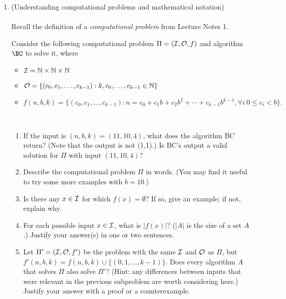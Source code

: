 \documentclass[11pt]{article}
\begin{document}
\begin{enumerate}
\begin{enumerate}
    \end{enumerate}
    
    \newpage
    
    \item (Understanding computational problems and mathematical notation)\\\\
    Recall the definition of a {\em computational problem} from Lecture Notes 1.  

 
    Consider the following computational problem $\Pi=(\mathcal{I},\mathcal{O},f)$ and algorithm $\BC$ to solve it, where
    \begin{itemize}                                
    \item $\mathcal{I} = \mathbb{N}\times\mathbb{N}\times \mathbb{N}$ 
    \item $\mathcal{O} = \{(c_0,c_1,\ldots,c_{k-1}) : k,c_0,\ldots,c_{k-1}\in \mathbb{N}\}$
    \item $f(n,b,k) = \{ (c_0,c_1,\ldots,c_{k-1}) : n=c_0+c_1b+c_2b^2+\cdots+c_{k-1}b^{k-1}, \forall i\ 0\leq c_i< b\}.$ 
    \end{itemize}

    
\begin{algorithm}[H]
    \\
    {
    \lElse{\Return{$\bot$}}}
\end{algorithm}


\begin{enumerate}
\item If the input is $(n,b,k) = (11,10,4)$, what does the algorithm BC return? (Note that the output is not (1,1).) Is BC's output a valid solution for $\Pi$ with input $(11,10,4)$?
\item Describe the computational problem $\Pi$ in words.  (You may find it useful to try some more examples with $b=10$.) 
\item Is there any $x\in \mathcal{I}$ for which $f(x)=\emptyset$? If so, give an example; if not, explain why.
\item For each possible input $x\in \mathcal{I}$, what is $|f(x)|$? ($|A|$ is the size of a set $A$.) Justify your answer(s) in one or two sentences.
\item Let $\Pi'=(\mathcal{I},\mathcal{O},f')$ be the problem with the same $\mathcal{I}$ and $\mathcal{O}$ as $\Pi$, but $f'(n,b,k) = f(n,b,k) \cup \{(0,1, \ldots,k-1)\}$. Does every algorithm $A$ that solves $\Pi$ also solve $\Pi'$? (Hint: any differences between inputs that were relevant in the previous subproblem are worth considering here.) Justify your answer with a proof or a counterexample.



\end{enumerate}
\end{enumerate}
\end{document}
